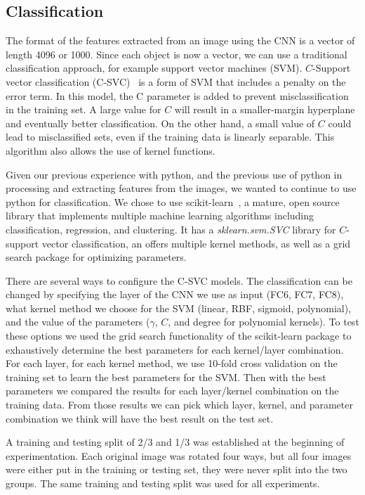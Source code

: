 \documentclass{article} %
\begin{document}
\subsection{Classification}
\label{sec:classification}
The format of the features extracted from an image using the CNN is a vector of length 4096 or 1000. Since each object is now a vector, we can use a traditional classification approach, for example support vector machines (SVM). $C$-Support vector classification (C-SVC)~\citep{boser1992training, cortes1995support} is a form of SVM that includes a penalty on the error term. In this model, the C parameter is added to prevent misclassification in the training set. A large value for $C$ will result in a smaller-margin hyperplane and eventually better classification. On the other hand, a small value of $C$ could lead to misclassified sets, even if the training data is linearly separable. This algorithm also allows the use of kernel functions.

Given our previous experience with python, and the previous use of python in processing and extracting features from the images, we wanted to continue to use python for classification. We chose to use scikit-learn~\citep{scikit-learn}, a mature, open source library that implements multiple machine learning algorithms including classification, regression, and clustering. It has a \emph{sklearn.svm.SVC} library for $C$-support vector classification, an offers multiple kernel methods, as well as a grid search package for optimizing parameters.

There are several ways to configure the C-SVC models. The classification can be changed by specifying the layer of the CNN we use as input (FC6, FC7, FC8), what kernel method we choose for the SVM (linear, RBF, sigmoid, polynomial), and the value of the parameters ($\gamma$, $C$, and degree for polynomial kernels). To test these options we used the grid search functionality of the scikit-learn package to exhaustively determine the best parameters for each kernel/layer combination. For each layer, for each kernel method, we use 10-fold cross validation on the training set to learn the best parameters for the SVM. Then with the best parameters we compared the results for each layer/kernel combination on the training data. From those results we can pick which layer, kernel, and parameter combination we think will have the best result on the test set.

A training and testing split of 2/3 and 1/3 was established at the beginning of experimentation. Each original image was rotated four ways, but all four images were either put in the training or testing set, they were never split into the two groups. The same training and testing split was used for all experiments.
 
\end{document}
